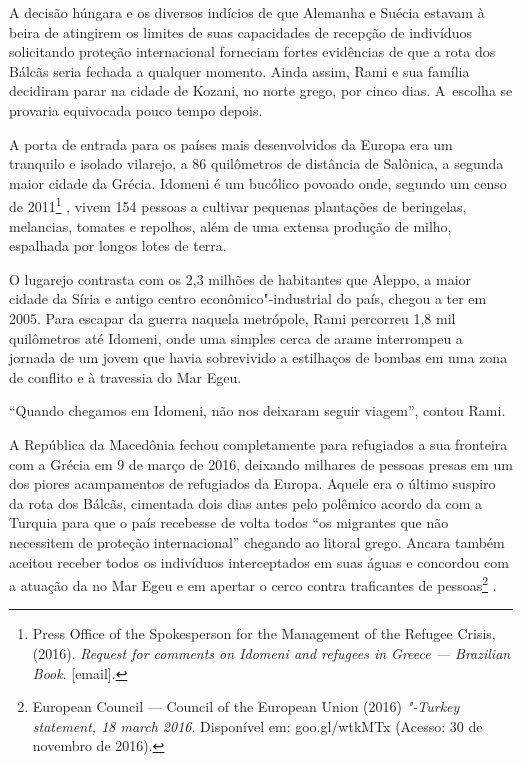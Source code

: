 A decisão húngara e os diversos indícios de que Alemanha e Suécia
estavam à beira de atingirem os limites de suas capacidades de recepção
de indivíduos solicitando proteção internacional forneciam fortes
evidências de que a rota dos Bálcãs seria fechada a qualquer momento.
Ainda assim, Rami e sua família decidiram parar na cidade de Kozani, no
norte grego, por cinco dias. A~escolha se provaria equivocada pouco
tempo depois.

A porta de entrada para os países mais desenvolvidos da Europa era um
tranquilo e isolado vilarejo, a 86 quilômetros de distância de Salônica,
a segunda maior cidade da Grécia. Idomeni é um bucólico povoado onde,
segundo um censo de 2011\footnote{ Press Office of the Spokesperson for the Management
of the Refugee Crisis, (2016). \emph{Request for comments on Idomeni and
refugees in Greece --- Brazilian Book}. {[}email{]}.} , vivem 154 pessoas a
cultivar pequenas plantações de beringelas, melancias, tomates e
repolhos, além de uma extensa produção de milho, espalhada por longos
lotes de terra.

O lugarejo contrasta com os 2,3 milhões de habitantes que Aleppo, a
maior cidade da Síria e antigo centro econômico"-industrial do país,
chegou a ter em 2005. Para escapar da guerra naquela metrópole, Rami
percorreu 1,8 mil quilômetros até Idomeni, onde uma simples cerca de
arame interrompeu a jornada de um jovem que havia sobrevivido a
estilhaços de bombas em uma zona de conflito e à travessia do Mar Egeu.

``Quando chegamos em Idomeni, não nos deixaram seguir viagem'', contou
Rami.

A República da Macedônia fechou completamente para refugiados a sua
fronteira com a Grécia em 9 de março de 2016, deixando milhares de
pessoas presas em um dos piores acampamentos de refugiados da Europa.
Aquele era o último suspiro da rota dos Bálcãs, cimentada dois dias
antes pelo polêmico acordo da  com a Turquia para que o país recebesse
de volta todos ``os migrantes que não necessitem de proteção
internacional'' chegando ao litoral grego. Ancara também aceitou receber
todos os indivíduos interceptados em suas águas e concordou com a
atuação da  no Mar Egeu e em apertar o cerco contra traficantes de
pessoas\footnote{ European Council --- Council of the European Union
(2016) \emph{"-Turkey statement, 18 march 2016}. Disponível em:
goo.gl/wtkMTx
(Acesso: 30 de novembro de 2016).} .

